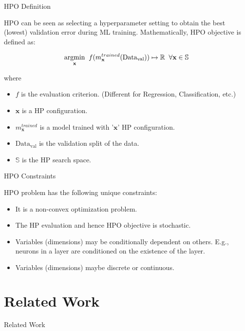 \documentclass{beamer}
\begin{document}
\begin{frame}[t]{HPO Definition}

HPO can be seen as selecting a hyperparameter setting to obtain the best (lowest) validation error during ML training.
Mathematically,  HPO objective is defined as:

$$
\underset{\rm \textbf{x}}{\rm argmin} \;\; f(m^{trained}_{\textbf{x}}(\textrm{Data}_{\textrm{val}})) \mapsto \mathbb{R}  \;\;  \forall \textbf{x} \in \mathbb{S}
$$

where
\begin{itemize}
\item $f$ is the evaluation criterion. (Different for Regression,  Classification, etc.)
\item $\textbf{x}$ is a HP configuration.
\item $m^{trained}_{\textbf{x}}$ is a model trained with '$\textbf{x}$' HP configuration.
\item $\textrm{Data}_{\textrm{val}}$ is the validation split of the data.
\item $\mathbb{S}$ is the HP search space.
\end{itemize}

\end{frame}

\begin{frame}[t]{HPO Constraints}

HPO problem has the following unique constraints:

\begin{itemize}
\item It is a non-convex optimization problem.
\item The HP evaluation and hence HPO objective is stochastic.
\item Variables (dimensions) may be conditionally dependent on others. E.g.,  neurons in a layer are conditioned on the existence of the layer.
\item Variables (dimensions) maybe discrete or continuous.
\end{itemize}


\end{frame}

\section{Related Work}

\begin{frame}

\centering
\LARGE{Related Work}

\end{frame}
\end{document}
